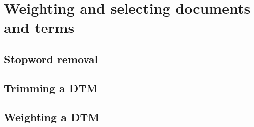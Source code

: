 \section{Weighting and selecting documents and terms}
\label{sec:dtmselect}

\subsection{Stopword removal}

\subsection{Trimming a DTM}


\subsection{Weighting a DTM}

